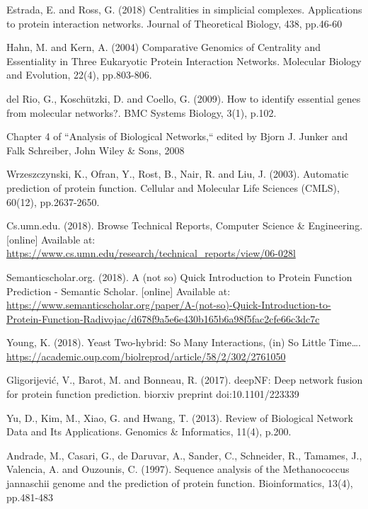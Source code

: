 \documentclass[9pt]{article}
\begin{document}
\newpage
\begin{thebibliography}{8}
Estrada, E. and Ross, G. (2018)
Centralities in simplicial complexes. Applications to protein interaction networks. Journal of Theoretical Biology, 438, pp.46-60

Hahn, M. and Kern, A. (2004)
Comparative Genomics of Centrality and Essentiality in Three Eukaryotic Protein Interaction Networks. Molecular Biology and Evolution, 22(4), pp.803-806.

del Rio, G., Koschützki, D. and Coello, G. (2009). 
How to identify essential genes from molecular networks?. BMC Systems Biology, 3(1), p.102.

Chapter 4 of “Analysis of Biological Networks,“ edited by Bjorn J. Junker and Falk Schreiber, John Wiley \& Sons, 2008 

Wrzeszczynski, K., Ofran, Y., Rost, B., Nair, R. and Liu, J. (2003). Automatic prediction of protein function. Cellular and Molecular Life Sciences (CMLS), 60(12), pp.2637-2650.
 
Cs.umn.edu. (2018). Browse Technical Reports, Computer Science \& Engineering. [online] Available at: \url{https://www.cs.umn.edu/research/technical_reports/view/06-028l} 

Semanticscholar.org. (2018). A (not so) Quick Introduction to Protein Function Prediction - Semantic Scholar. [online] Available at: \url{https://www.semanticscholar.org/paper/A-(not-so)-Quick-Introduction-to-Protein-Function-Radivojac/d678f9a5e6e430b165b6a98f5fac2cfe66c3dc7c}

Young, K. (2018). Yeast Two-hybrid: So Many Interactions, (in) So Little Time….
\url{https://academic.oup.com/biolreprod/article/58/2/302/2761050}

Gligorijević, V., Barot, M. and Bonneau, R. (2017). deepNF: Deep network fusion for protein function prediction. biorxiv preprint doi:10.1101/223339

Yu, D., Kim, M., Xiao, G. and Hwang, T. (2013). Review of Biological Network Data and Its Applications. Genomics \& Informatics, 11(4), p.200.

Andrade, M., Casari, G., de Daruvar, A., Sander, C., Schneider, R., Tamames, J., Valencia, A. and Ouzounis, C. (1997). Sequence analysis of the Methanococcus jannaschii genome and the prediction of protein function. Bioinformatics, 13(4), pp.481-483


\end{thebibliography}
\end{document}
